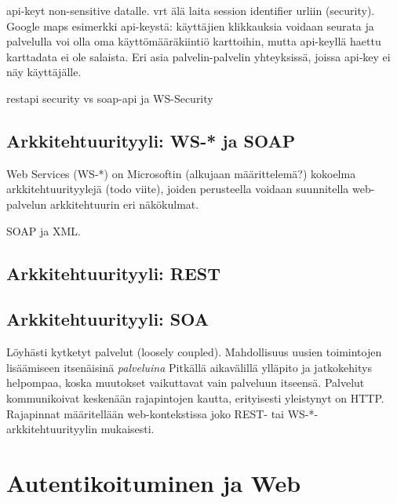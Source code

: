\documentclass[finnish,gradu]{tktltiki}
\begin{document}
  api-keyt non-sensitive datalle. vrt älä laita session identifier urliin (security). Google maps esimerkki api-keystä: käyttäjien klikkauksia voidaan seurata ja palvelulla voi olla oma käyttömääräkiintiö karttoihin, mutta api-keyllä haettu karttadata ei ole salaista. Eri asia palvelin-palvelin yhteyksissä, joissa api-key ei näy käyttäjälle.

  restapi security vs soap-api ja WS-Security


  \subsection{Arkkitehtuurityyli: WS-* ja SOAP} %
  \label{sub:arkkitehtuurityyli_ws_}
    Web Services (WS-*) on Microsoftin (alkujaan määrittelemä?) kokoelma arkkitehtuurityylejä (todo viite), joiden perusteella voidaan suunnitella web-palvelun arkkitehtuurin eri näkökulmat.

    SOAP ja XML.


  \subsection{Arkkitehtuurityyli: REST} %
  \label{sub:arkkitehtuurityyli_rest}



  \subsection{Arkkitehtuurityyli: SOA} %
  \label{sub:arkkitehtuurityyli_soa}

  Löyhästi kytketyt palvelut (loosely coupled).
  Mahdollisuus uusien toimintojen lisäämiseen itsenäisinä \emph{palveluina}
  Pitkällä aikavälillä ylläpito ja jatkokehitys helpompaa, koska muutokset vaikuttavat vain palveluun itseensä.
  Palvelut kommunikoivat keskenään rajapintojen kautta, erityisesti yleistynyt on HTTP.
  Rajapinnat määritellään web-kontekstissa joko REST- tai WS-*-arkkitehtuurityylin mukaisesti.




\section{Autentikoituminen ja Web} %
\label{sec:autentikoituminen_ja_web}
\end{document}
